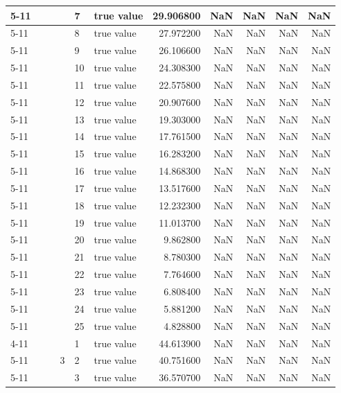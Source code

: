 \begin{tabular}{llllllrrrrr}
\cline{5-11}
 &  &  &  & 7 & true value & 29.906800 & NaN & NaN & NaN & NaN \\
\cline{5-11}
 &  &  &  & 8 & true value & 27.972200 & NaN & NaN & NaN & NaN \\
\cline{5-11}
 &  &  &  & 9 & true value & 26.106600 & NaN & NaN & NaN & NaN \\
\cline{5-11}
 &  &  &  & 10 & true value & 24.308300 & NaN & NaN & NaN & NaN \\
\cline{5-11}
 &  &  &  & 11 & true value & 22.575800 & NaN & NaN & NaN & NaN \\
\cline{5-11}
 &  &  &  & 12 & true value & 20.907600 & NaN & NaN & NaN & NaN \\
\cline{5-11}
 &  &  &  & 13 & true value & 19.303000 & NaN & NaN & NaN & NaN \\
\cline{5-11}
 &  &  &  & 14 & true value & 17.761500 & NaN & NaN & NaN & NaN \\
\cline{5-11}
 &  &  &  & 15 & true value & 16.283200 & NaN & NaN & NaN & NaN \\
\cline{5-11}
 &  &  &  & 16 & true value & 14.868300 & NaN & NaN & NaN & NaN \\
\cline{5-11}
 &  &  &  & 17 & true value & 13.517600 & NaN & NaN & NaN & NaN \\
\cline{5-11}
 &  &  &  & 18 & true value & 12.232300 & NaN & NaN & NaN & NaN \\
\cline{5-11}
 &  &  &  & 19 & true value & 11.013700 & NaN & NaN & NaN & NaN \\
\cline{5-11}
 &  &  &  & 20 & true value & 9.862800 & NaN & NaN & NaN & NaN \\
\cline{5-11}
 &  &  &  & 21 & true value & 8.780300 & NaN & NaN & NaN & NaN \\
\cline{5-11}
 &  &  &  & 22 & true value & 7.764600 & NaN & NaN & NaN & NaN \\
\cline{5-11}
 &  &  &  & 23 & true value & 6.808400 & NaN & NaN & NaN & NaN \\
\cline{5-11}
 &  &  &  & 24 & true value & 5.881200 & NaN & NaN & NaN & NaN \\
\cline{5-11}
 &  &  &  & 25 & true value & 4.828800 & NaN & NaN & NaN & NaN \\
\cline{4-11} \cline{5-11}
 &  &  & \multirow[t]{25}{*}{3} & 1 & true value & 44.613900 & NaN & NaN & NaN & NaN \\
\cline{5-11}
 &  &  &  & 2 & true value & 40.751600 & NaN & NaN & NaN & NaN \\
\cline{5-11}
 &  &  &  & 3 & true value & 36.570700 & NaN & NaN & NaN & NaN \\

\end{tabular}
